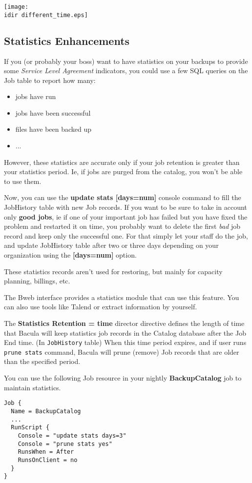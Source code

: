 \texttt{[image: \\idir different\_time.eps]}

\subsection{Statistics Enhancements}
If you (or probably your boss) want to have statistics on your backups to
provide some \textit{Service Level Agreement} indicators, you could use a few
SQL queries on the Job table to report how many:

\begin{itemize}
\item jobs have run
\item jobs have been successful
\item files have been backed up
\item ...
\end{itemize}

However, these statistics are accurate only if your job retention is greater
than your statistics period. Ie, if jobs are purged from the catalog, you won't
be able to use them. 

Now, you can use the \textbf{update stats [days=num]} console command to fill
the JobHistory table with new Job records. If you want to be sure to take in
account only \textbf{good jobs}, ie if one of your important job has failed but
you have fixed the problem and restarted it on time, you probably want to
delete the first \textit{bad} job record and keep only the successful one. For
that simply let your staff do the job, and update JobHistory table after two or
three days depending on your organization using the \textbf{[days=num]} option.

These statistics records aren't used for restoring, but mainly for
capacity planning, billings, etc.

The Bweb interface provides a statistics module that can use this feature. You
can also use tools like Talend or extract information by yourself.

The \textbf{Statistics Retention = \lt{}time\gt{}} director directive defines
the length of time that Bacula will keep statistics job records in the Catalog
database after the Job End time. (In \texttt{JobHistory} table) When this time
period expires, and if user runs \texttt{prune stats} command, Bacula will
prune (remove) Job records that are older than the specified period.

You can use the following Job resource in your nightly \textbf{BackupCatalog}
job to maintain statistics.
\begin{verbatim}
Job {
  Name = BackupCatalog
  ...
  RunScript {
    Console = "update stats days=3"
    Console = "prune stats yes"
    RunsWhen = After
    RunsOnClient = no
  }
}
\end{verbatim}

